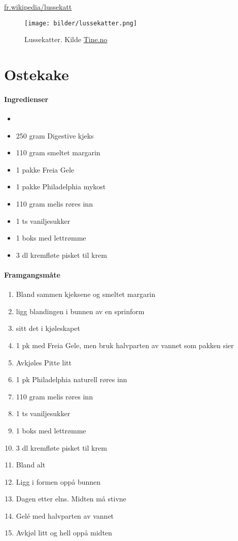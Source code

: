 \documentclass[12pt,a4paper]{book}
\begin{document}
{\href{https://fr.wikipedia.org/wiki/Lussekatt}{fr.wikipedia/lussekatt}


\begin{figure}[p]
	\texttt{[image: bilder/lussekatter.png]}
	\caption[Lussekatter]{Lussekatter. Kilde \href{http://www.tine.no/imageresize/383493_999_1150.png}{Tine.no}}
	\label{lussekatter}
\end{figure}
\clearpage{}
\clearpage{}\section{﻿Ostekake}


\paragraph{Ingredienser}
\begin{itemize}[noitemsep]
	\item
	\item 250 gram Digestive kjeks
	\item 110 gram smeltet margarin
	\item 1 pakke Freia Gele
	\item 1 pakke Philadelphia mykost
	\item 110 gram melis røres inn
	\item 1 ts vaniljesukker
	\item 1 boks med lettrømme
	\item 3 dl kremfløte pisket til krem

\end{itemize}

\paragraph{Framgangsmåte}
\begin{enumerate}[noitemsep]
	\item Bland sammen kjeksene og smeltet margarin
	\item ligg blandingen i bunnen av en sprinform
	\item sitt det i kjøleskapet
	\item 1 pk med Freia Gele, men bruk halvparten av vannet som pakken sier
	\item Avkjøles Pitte litt
	\item 1 pk Philadelphia naturell røres inn
	\item 110 gram melis røres inn
	\item 1 ts vaniljesukker
	\item 1 boks med lettrømme
	\item 3 dl kremfløte pisket til krem
	\item Bland alt
	\item Ligg i formen oppå bunnen
	\item Dagen etter elns.  Midten må stivne
	\item Gelé med halvparten av vannet
	\item Avkjøl litt og hell oppå midten
\end{enumerate}



}
\end{document}
